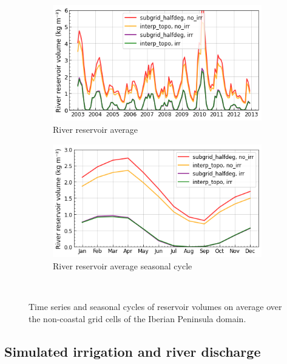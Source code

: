 \begin{figure}[htbp]
    \begin{subfigure}[b]{0.48\textwidth}
        \caption{River reservoir average}
        \includegraphics[width=\textwidth]{images/chap3/time_series/cont_streamr_time_series.png}
    \end{subfigure} 
    \begin{subfigure}[b]{0.48\textwidth}
        \caption{River reservoir average seasonal cycle}
        \includegraphics[width=\textwidth]{images/chap3/time_series/cont_streamr_seasonal_cycle.png}
    \end{subfigure} \\

    \caption{Time series and seasonal cycles of reservoir volumes on average over the non-coastal grid cells of the Iberian Peninsula domain.}
    \label{fig:reservoir_cont_time_series}
\end{figure}

\subsection{Simulated irrigation and river discharge}

